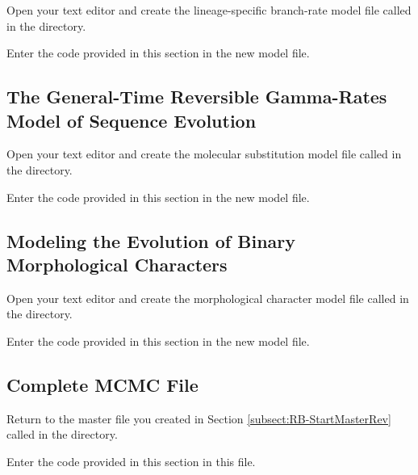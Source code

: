 {\begin{framed}
Open your text editor and create the lineage-specific branch-rate model file called {\textcolor{red}{}} in the  directory.

Enter the \Rev code provided in this section in the new model file.
\end{framed}}


\bigskip

\subsection{The General-Time Reversible Gamma-Rates Model of Sequence Evolution}\label{subsect:RB-ModelGTRG}

{\begin{framed}
Open your text editor and create the molecular substitution model file called {\textcolor{red}{}} in the  directory.

Enter the \Rev code provided in this section in the new model file.
\end{framed}}

\bigskip

\subsection{Modeling the Evolution of Binary Morphological Characters}\label{subsect:RB-ModelMorph}

{\begin{framed}
Open your text editor and create the morphological character model file called {\textcolor{red}{}} in the  directory.

Enter the \Rev code provided in this section in the new model file.
\end{framed}}

\bigskip

\subsection{Complete MCMC File}\label{subsect:RB-CompleteMCMC}

{\begin{framed}
Return to the master \Rev file you created in Section \ref{subsect:RB-StartMasterRev} called {\textcolor{red}{}} in the  directory.

Enter the \Rev code provided in this section in this file.
\end{framed}}

